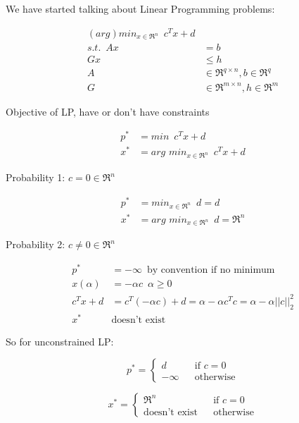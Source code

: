 We have started talking about Linear Programming problems:

\begin{align*}
(arg)min_{x\in \Re^n} \,\,\, c^Tx + d\\
s.t. \,\,\, Ax& = b\\
Gx &\leq h\\
A&\in \Re^{q\times n}, b\in \Re^{q}\\
G&\in \Re^{m\times n}, h\in \Re^{m}
\end{align*}

Objective of LP, have or don't have constraints

\begin{align*}
p^* &= min \,\,\, c^Tx+d\\
x^* &= arg\,\, min_{x\in \Re^n} \,\,\, c^Tx+d
\end{align*}

Probability 1: $c = 0 \in \Re^n$

\begin{align*}
p^* &= min_{x\in \Re^n} \,\,\, d=d\\
x^* &= arg\,\, min_{x\in \Re^n} \,\,\, d = \Re^n
\end{align*}

Probability 2: $c \neq 0 \in \Re^n$

\begin{align*}
p^* &= -\infty\,\,\, \text{by convention if no minimum}\\
x(\alpha) &= -\alpha c \,\,\, \alpha \geq 0\\
c^Tx + d &= c^T(-\alpha c) + d = \alpha - \alpha c^Tc = \alpha - \alpha||c||^2_2\\
x^* &\text{doesn't exist}
\end{align*}

So for unconstrained LP:

\begin{equation*}
p^*=\left\{
\begin{aligned}
d &  & \text{if } c=0 \\
-\infty &  & \text{otherwise}
\end{aligned}
\right.
\end{equation*}

\begin{equation*}
x^*=\left\{
\begin{aligned}
\Re^n & &\text{if } c=0 \\
\text{doesn't exist} &  & \text{otherwise}
\end{aligned}
\right.
\end{equation*}

